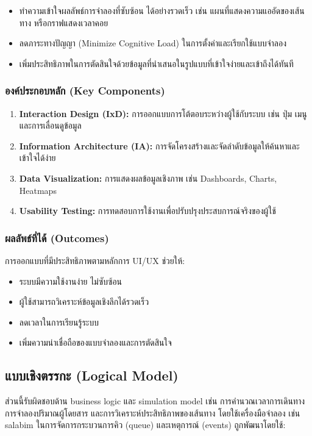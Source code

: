 \begin{itemize}
    \item ทำความเข้าใจผลลัพธ์การจำลองที่ซับซ้อน ได้อย่างรวดเร็ว เช่น แผนที่แสดงความแออัดของเส้นทาง
    หรือกราฟแสดงเวลาคอย
    \item ลดภาระทางปัญญา (Minimize Cognitive Load) ในการตั้งค่าและเรียกใช้แบบจำลอง
    \item เพิ่มประสิทธิภาพในการตัดสินใจด้วยข้อมูลที่นำเสนอในรูปแบบที่เข้าใจง่ายและเข้าถึงได้ทันที
\end{itemize}

\subsubsection{\textbf{องค์ประกอบหลัก (Key Components)}}
\begin{enumerate}
    \item \textbf{Interaction Design (IxD):} การออกแบบการโต้ตอบระหว่างผู้ใช้กับระบบ เช่น ปุ่ม เมนู และการเลื่อนดูข้อมูล
    \item \textbf{Information Architecture (IA):} การจัดโครงสร้างและจัดลำดับข้อมูลให้ค้นหาและเข้าใจได้ง่าย
    \item \textbf{Data Visualization:} การแสดงผลข้อมูลเชิงภาพ เช่น Dashboards, Charts, Heatmaps
    \item \textbf{Usability Testing:} การทดสอบการใช้งานเพื่อปรับปรุงประสบการณ์จริงของผู้ใช้
\end{enumerate}

\subsubsection{\textbf{ผลลัพธ์ที่ได้ (Outcomes)}}
\begin{mypara}
    \indent การออกแบบที่มีประสิทธิภาพตามหลักการ UI/UX ช่วยให้:
\end{mypara}
\begin{itemize}
    \item ระบบมีความใช้งานง่าย ไม่ซับซ้อน
    \item ผู้ใช้สามารถวิเคราะห์ข้อมูลเชิงลึกได้รวดเร็ว
    \item ลดเวลาในการเรียนรู้ระบบ
    \item เพิ่มความน่าเชื่อถือของแบบจำลองและการตัดสินใจ
\end{itemize}


\subsection{แบบเชิงตรรกะ (Logical Model)}
  ส่วนนี้รับผิดชอบด้าน business logic และ simulation model
  เช่น การคำนวณเวลาการเดินทาง การจำลองปริมาณผู้โดยสาร 
  และการวิเคราะห์ประสิทธิภาพของเส้นทาง โดยใช้เครื่องมือจำลอง 
  เช่น salabim ในการจัดการกระบวนการคิว (queue) และเหตุการณ์ (events) ถูกพัฒนาโดยใช้:
